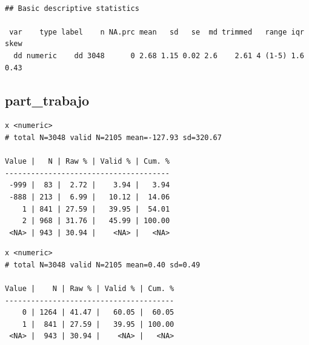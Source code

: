\documentclass[
  letterpaper,
  DIV=11,
  numbers=noendperiod]{scrreprt}
\newenvironment{Shaded}{\begin{snugshade}}{\end{snugshade}}
\newcommand{\AttributeTok}[1]{\textcolor[rgb]{0.40,0.45,0.13}{#1}}
\newcommand{\DecValTok}[1]{\textcolor[rgb]{0.68,0.00,0.00}{#1}}
\newcommand{\FunctionTok}[1]{\textcolor[rgb]{0.28,0.35,0.67}{#1}}
\newcommand{\NormalTok}[1]{\textcolor[rgb]{0.00,0.23,0.31}{#1}}
\newcommand{\OtherTok}[1]{\textcolor[rgb]{0.00,0.23,0.31}{#1}}
\newcommand{\SpecialCharTok}[1]{\textcolor[rgb]{0.37,0.37,0.37}{#1}}
\begin{document}
\begin{verbatim}

## Basic descriptive statistics

 var    type label    n NA.prc mean   sd   se  md trimmed   range iqr skew
  dd numeric    dd 3048      0 2.68 1.15 0.02 2.6    2.61 4 (1-5) 1.6 0.43
\end{verbatim}

\hypertarget{part_trabajo}{%
\subsection{part\_trabajo}\label{part_trabajo}}

\begin{Shaded}
\end{Shaded}

\begin{verbatim}
x <numeric> 
# total N=3048 valid N=2105 mean=-127.93 sd=320.67

Value |   N | Raw % | Valid % | Cum. %
--------------------------------------
 -999 |  83 |  2.72 |    3.94 |   3.94
 -888 | 213 |  6.99 |   10.12 |  14.06
    1 | 841 | 27.59 |   39.95 |  54.01
    2 | 968 | 31.76 |   45.99 | 100.00
 <NA> | 943 | 30.94 |    <NA> |   <NA>
\end{verbatim}

\begin{Shaded}
\end{Shaded}

\begin{verbatim}
x <numeric> 
# total N=3048 valid N=2105 mean=0.40 sd=0.49

Value |    N | Raw % | Valid % | Cum. %
---------------------------------------
    0 | 1264 | 41.47 |   60.05 |  60.05
    1 |  841 | 27.59 |   39.95 | 100.00
 <NA> |  943 | 30.94 |    <NA> |   <NA>
\end{verbatim}
\end{document}
